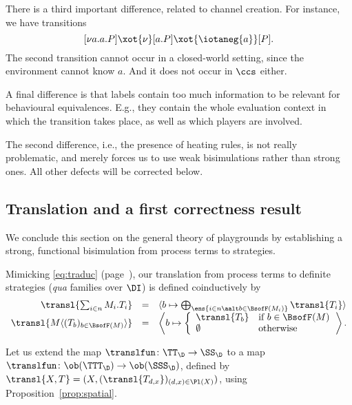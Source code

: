 \documentclass{LMCS}
\theoremstyle{plain}\newtheorem{satz}[thm]{Satz}
\begin{document}
\begin{exa}
  There is a third important difference, related to channel
  creation. For instance, we have transitions
  $$[\nu a.a.P] \xot{\nu} [a.P] \xot{\iotaneg{a}} [P].$$
  The second transition cannot occur in a closed-world setting, since
  the environment cannot know $a$.  And it does not occur in $\ccs$
  either.

  A final difference is that labels contain too much information to be
  relevant for behavioural equivalences. E.g., they contain the whole
  evaluation context in which the transition takes place, as well as
  which players are involved.

  The second difference, i.e., the presence of heating rules, is not
  really problematic, and merely forces us to use weak bisimulations
  rather than strong ones.  All other defects will be corrected below.
\end{exa}

\subsection{Translation and a first correctness result}
We conclude this section on the general theory of playgrounds by
establishing a strong, functional bisimulation from process terms to
strategies.

Mimicking \eqref{eq:traduc} (page~\pageref{eq:traduc}), our
translation from process terms to definite strategies (\emph{qua}
families over $\DI$) is defined coinductively by
\begin{equation}
\begin{array}{rcl}
  \transl{\sum_{i \in n} M_i.T_i} & = & \langle b \mapsto
      \bigoplus_{\ens{i \in n \aalt b \in \BsofF(M_i)}} \transl{T_i}
      \rangle \\
      \transl{M\langle (T_{b})_{b \in \BsofF (M)} \rangle} & = & 
      \left \langle b \mapsto \left \{
        {\begin{array}[c]{ll}
          \transl{T_{b}} & \mbox{if $b \in \BsofF(M)$} \\
          \emptyset & \mbox{otherwise}
        \end{array}}
\right . \right \rangle.
\end{array}\label{eq:transl}
\end{equation}

Let us extend the map $\translfun \colon \TT_\D \to \SS_\D$ to a map
$\translfun \colon \ob(\TTT_\D) \to \ob(\SSS_\D)$, defined by
$\transl{X,T} = (X, (\transl{T_{d,x}})_{(d,x) \in \Pl (X)})$, using
Proposition~\ref{prop:spatial}.
\end{document}

